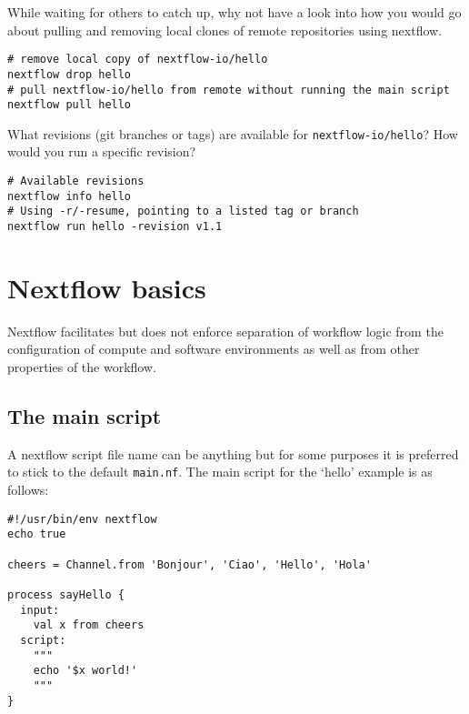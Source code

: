\begin{bonus}
While waiting for others to catch up, why not have a look into how you would go about pulling and removing  
local clones of remote repositories using nextflow.
\begin{answer}
\begin{lstlisting}
# remove local copy of nextflow-io/hello
nextflow drop hello
# pull nextflow-io/hello from remote without running the main script
nextflow pull hello
\end{lstlisting}
\end{answer}
\end{bonus}

\begin{bonus}
What revisions (git branches or tags) are available for \texttt{nextflow-io/hello}?
How would you run a specific revision? 
\begin{answer}
\begin{lstlisting}
# Available revisions 
nextflow info hello
# Using -r/-resume, pointing to a listed tag or branch
nextflow run hello -revision v1.1
\end{lstlisting}
\end{answer}
\end{bonus}

\section{Nextflow basics}

Nextflow facilitates but does not enforce separation of workflow logic from the configuration
of compute and software environments as well as from other properties of the workflow.


\subsection{The main script}

A nextflow script file name can be anything but for some purposes it is preferred to stick to the default \texttt{main.nf}. The main script for the `hello' example is as follows:


\begin{lstlisting}
#!/usr/bin/env nextflow
echo true 

cheers = Channel.from 'Bonjour', 'Ciao', 'Hello', 'Hola'

process sayHello {
  input: 
    val x from cheers
  script:
    """
    echo '$x world!'
    """
}
\end{lstlisting}

